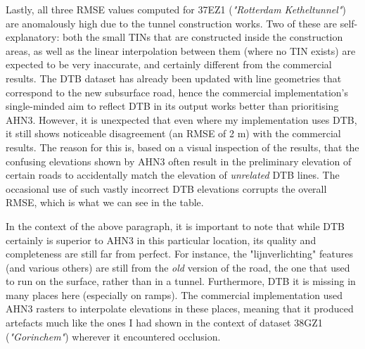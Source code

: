 Lastly, all three RMSE values computed for 37EZ1 (\textit{"Rotterdam Ketheltunnel"}) are anomalously high due to the tunnel construction works. Two of these are self-explanatory: both the small TINs that are constructed inside the construction areas, as well as the linear interpolation between them (where no TIN exists) are expected to be very inaccurate, and certainly different from the commercial results. The DTB dataset has already been updated with line geometries that correspond to the new subsurface road, hence the commercial implementation's single-minded aim to reflect DTB in its output works better than prioritising AHN3. However, it is unexpected that even where my implementation uses DTB, it still shows noticeable disagreement (an RMSE of 2 m) with the commercial results. The reason for this is, based on a visual inspection of the results, that the confusing elevations shown by AHN3 often result in the preliminary elevation of certain roads to accidentally match the elevation of \textit{unrelated} DTB lines. The occasional use of such vastly incorrect DTB elevations corrupts the overall RMSE, which is what we can see in the table.

In the context of the above paragraph, it is important to note that while DTB certainly is superior to AHN3 in this particular location, its quality and completeness are still far from perfect. For instance, the "lijnverlichting" features (and various others) are still from the \textit{old} version of the road, the one that used to run on the surface, rather than in a tunnel. Furthermore, DTB it is missing in many places here (especially on ramps). The commercial implementation used AHN3 rasters to interpolate elevations in these places, meaning that it produced artefacts much like the ones I had shown in the context of dataset 38GZ1 (\textit{"Gorinchem"}) wherever it encountered occlusion.